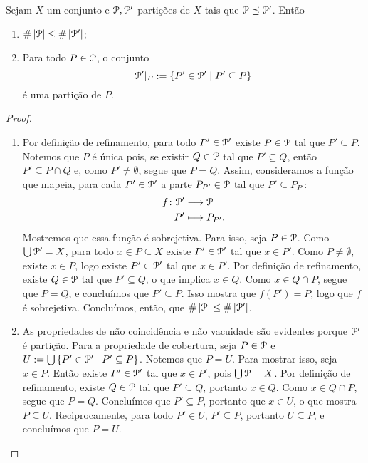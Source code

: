 \begin{proposition}
Sejam $X$ um conjunto e $\mathcal{P},\mathcal{P}'$ partições de $X$ tais que $\mathcal{P} \preceq \mathcal{P}'$. Então
	\begin{enumerate}
	\item $\#\left\lvert{\mathcal{P}}\right\rvert \leq \#\left\lvert{\mathcal{P}'}\right\rvert$;
	\item Para todo $P \in \mathcal{P}$, o conjunto
		\begin{equation*}
		\mathcal{P}'|_P := \left\{{P' \in \mathcal{P}'}\;\middle\vert\;{P' \subseteq P}\right\}
		\end{equation*}
é uma partição de $P$.
	\end{enumerate}
\end{proposition}
\begin{proof}
	\begin{enumerate}
	\item Por definição de refinamento, para todo $P' \in \mathcal{P}'$ existe $P \in \mathcal{P}$ tal que $P' \subseteq P$. Notemos que $P$ é única pois, se existir $Q \in \mathcal{P}$ tal que $P' \subseteq Q$, então $P' \subseteq P \cap Q$ e, como $P' \neq \emptyset$, segue que $P = Q$. Assim, consideramos a função que mapeia, para cada $P' \in \mathcal{P}'$ a parte $P_{P'} \in \mathcal{P}$ tal que $P' \subseteq P_{P'}$:
	\begin{align*}
	{f}\colon {\mathcal{P}'} &\longrightarrow {\mathcal{P}} \\{P'} &\longmapsto P_{P'}.
	\end{align*}
Mostremos que essa função é sobrejetiva. Para isso, seja $P \in \mathcal{P}$. Como $\bigcup \mathcal{P}' = X$, para todo $x \in P \subseteq X$ existe $P' \in \mathcal{P}'$ tal que $x \in P'$. Como $P \neq \emptyset$, existe $x \in P$, logo existe $P' \in \mathcal{P}'$ tal que $x \in P'$. Por definição de refinamento, existe $Q \in \mathcal{P}$ tal que $P' \subseteq Q$, o que implica $x \in Q$. Como $x \in Q \cap P$, segue que $P=Q$, e concluímos que $P' \subseteq P$. Isso mostra que $f(P')=P$, logo que $f$ é sobrejetiva. Concluímos, então, que $\#\left\lvert{\mathcal{P}}\right\rvert \leq \#\left\lvert{\mathcal{P}'}\right\rvert$.
	
	\item As propriedades de não coincidência e não vacuidade são evidentes porque $\mathcal{P}'$ é partição. Para a propriedade de cobertura, seja $P \in \mathcal{P}$ e $U := \bigcup \left\{{P' \in \mathcal{P}'}\;\middle\vert\;{P' \subseteq P}\right\}$. Notemos que $P=U$. Para mostrar isso, seja $x \in P$. Então existe $P' \in \mathcal{P}'$ tal que $x \in P'$, pois $\bigcup \mathcal{P}=X$. Por definição de refinamento, existe $Q \in \mathcal{P}$ tal que $P' \subseteq Q$, portanto $x \in Q$. Como $x \in Q \cap P$, segue que $P=Q$. Concluímos que $P' \subseteq P$, portanto que $x \in U$, o que mostra $P \subseteq U$. Reciprocamente, para todo $P' \in U$, $P' \subseteq P$, portanto $U \subseteq P$, e concluímos que $P=U$.
	\qedhere
	\end{enumerate}
\end{proof}

